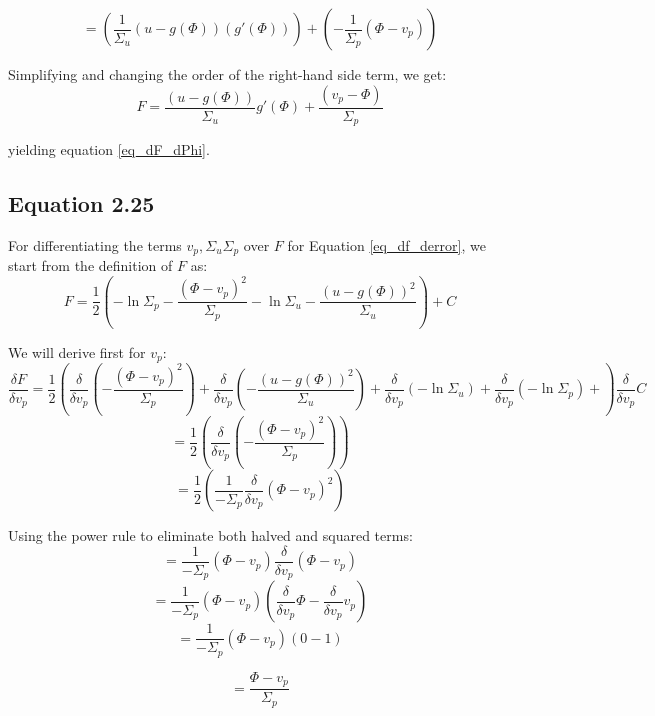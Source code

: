 $$ = 
\left( \frac{1}{\Sigma_u} (u-g(\Phi))(g'(\Phi)) \right) +
\left( -\frac{1}{\Sigma_p} (\Phi-v_p) \right)
$$

Simplifying and changing the order of the right-hand side term, we get:
$$ F = 
\frac{(u-g(\Phi))}{\Sigma_u} g'(\Phi)   +
\frac{(v_p-\Phi)}{\Sigma_p}  
$$

yielding equation \ref{eq_dF_dPhi}. 



\newpage 
\subsection{Equation 2.25}
For differentiating the terms $v_p, \Sigma_u \Sigma_p$ over $F$ for Equation \ref{eq_df_derror}, we start from the definition of $F$ as:
$$ F = \frac{1}{2} \left( - \ln \Sigma_p - \frac{(\Phi - v_p)^2}{\Sigma_p}  - \ln \Sigma_u - \frac{(u - g(\Phi))^2}{\Sigma_u}\right) + C$$

We will derive first for $v_p$:
$$ \frac{\delta F}{\delta v_p} =
\frac{1}{2} \left(
\frac{\delta}{\delta v_p} \left( - \frac{(\Phi - v_p)^2}{\Sigma_p} \right) +
\frac{\delta}{\delta v_p} \left( - \frac{(u - g(\Phi))^2}{\Sigma_u} \right) +
\frac{\delta}{\delta v_p} \left( - \ln \Sigma_u  \right) + 
\frac{\delta}{\delta v_p} \left( - \ln \Sigma_p  \right) + 
\right)
\frac{\delta}{\delta v_p} C
$$
$$ 
 = \frac{1}{2} \left(
\frac{\delta}{\delta v_p} \left( - \frac{(\Phi - v_p)^2}{\Sigma_p} \right) 
\right)
$$
$$ 
 = \frac{1}{2} \left(
\frac{1}{-\Sigma_p}
\frac{\delta}{\delta v_p} (\Phi - v_p)^2
\right)
$$

Using the power rule to eliminate both halved and squared terms:
$$ 
= 
\frac{1}{-\Sigma_p}
(\Phi - v_p)
\frac{\delta}{\delta v_p} (\Phi - v_p)
$$
$$ 
= 
\frac{1}{-\Sigma_p}
(\Phi - v_p)
\left(\frac{\delta}{\delta v_p} \Phi -
\frac{\delta}{\delta v_p} v_p\right)
$$
$$ 
= 
\frac{1}{-\Sigma_p}
(\Phi - v_p)
(0 -
1)
$$

$$ 
= \frac{\Phi - v_p}{\Sigma_p}
$$


